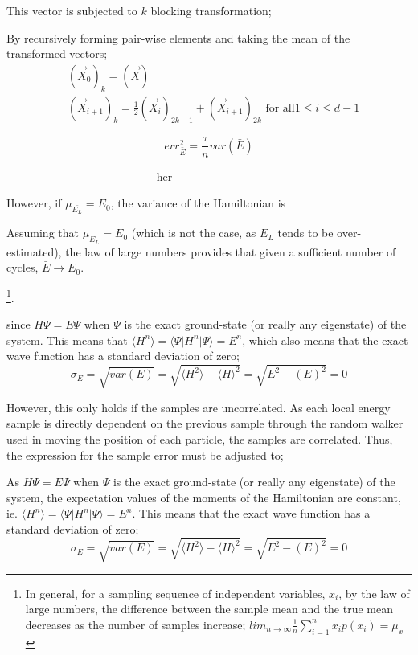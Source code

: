 \documentclass[%
oneside,                 %
final,                   %
10pt]{article}
\begin{document}
 This vector is subjected to $k$ blocking transformation;


By recursively forming pair-wise elements and taking the mean of the transformed vectors;
\begin{align*}
&(\vec X_0)_k = (\vec X)\\
&(\vec X_{i+1})_k = \frac{1}{2}(\vec X_i)_{2k-1} +( \vec X_{i+1} )_{2k} \text{ for all} 1 \leq i \leq d-1
\end{align*}


\begin{equation}
err^2_{\bar{E}}=\frac{\tau}{n} var(\bar E)
\end{equation}


--------------------------------------- her

However, if $\mu_{\bar{E_L}}=E_0$, the variance of the Hamiltonian is



Assuming that $\mu_{\bar{E_L}}=E_0$ (which is not the case, as $E_L$ tends to be over-estimated), the law of large numbers provides that given a sufficient number of cycles, $\bar{E} \rightarrow  E_0$.

 \footnote{ In general, for a sampling sequence of independent variables, ${x_i}$, by the law of large numbers, the difference between the sample mean and the true mean decreases as the number of samples increase; $ lim_{n\rightarrow \infty} \frac{1}{n} \sum^n_{i=1} x_i p(x_i)= \mu_x $}. 

 since $H\Psi = E \Psi$ when $\Psi$ is the exact ground-state (or really any eigenstate) of the system. This means that $\langle H^n \rangle=\langle \Psi \rvert H^n \lvert \Psi \rangle=E^n$, which also means that the exact wave function has a standard deviation of zero;
\begin{equation}
\sigma_{E}=\sqrt{var(E)}=\sqrt{ \langle H^2 \rangle-\langle H \rangle^2 }=\sqrt{ E^2 -(E)^2}= 0
\end{equation}




However, this only holds if the samples are uncorrelated. As each local energy sample is directly dependent on the previous sample through the random walker used in moving the position of each particle, the samples are correlated. Thus, the expression for the sample error must be adjusted to;


 As $H\Psi = E \Psi$ when $\Psi$ is the exact ground-state (or really any eigenstate) of the system, the expectation values of the moments of the Hamiltonian are constant, ie. $\langle H^n \rangle=\langle \Psi \rvert H^n \lvert \Psi \rangle=E^n$. This means that the exact wave function has a standard deviation of zero;
\begin{equation}
\sigma_{E}=\sqrt{var(E)}=\sqrt{ \langle H^2 \rangle-\langle H \rangle^2 }=\sqrt{ E^2 -(E)^2}= 0
\end{equation}
\end{document}

